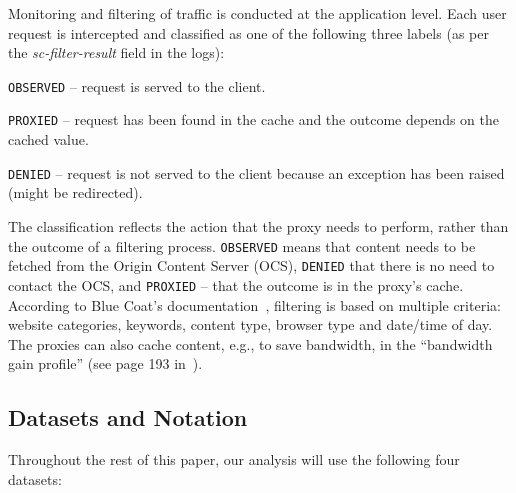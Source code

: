\documentclass{sig-alternate-2013}
\begin{document}
Monitoring and filtering of traffic is conducted at the application level. 
Each user request is intercepted and classified as one of the following three labels (as per the \emph{sc-filter-result} field in the logs): 

\begin{compactitem}
 \item \texttt{OBSERVED} -- request is served to the client.
 \item \texttt{PROXIED} -- request has been found in the cache and the outcome depends on the cached value.
 \item \texttt{DENIED} -- request is not served to the client because an exception has been raised (might be redirected).
\end{compactitem}

The classification reflects the action that the proxy needs to perform, rather than the outcome of a filtering process. \texttt{OBSERVED} means that content needs to be fetched from the Origin Content Server (OCS), \texttt{DENIED} that there is no need to contact the OCS, and \texttt{PROXIED} -- that the outcome is in the proxy's cache. 
According to Blue Coat's documentation~\cite{slideshare}, filtering is based on multiple criteria: website categories, keywords, content type, browser type and date/time of day. The proxies can also cache content, e.g., to save bandwidth, in the ``bandwidth gain profile'' (see page 193 in~\cite{wikileaks}).







\subsection{Datasets and Notation}\label{subsec:datasets}
Throughout the rest of this paper, our analysis will use the following four datasets:
\end{document}
